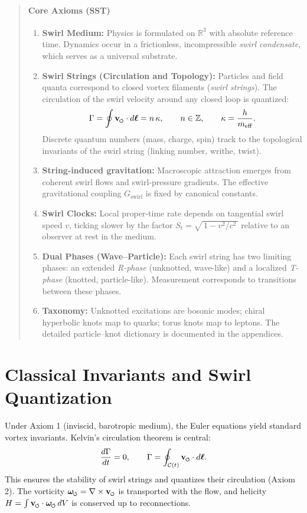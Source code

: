 \documentclass[11pt]{article}
\newcommand{\swirlarrow}{%
    \mathchoice{\mkern-2mu\scriptstyle\boldsymbol{\circlearrowleft}}%
    {\mkern-2mu\scriptstyle\boldsymbol{\circlearrowleft}}%
    {\mkern-2mu\scriptscriptstyle\boldsymbol{\circlearrowleft}}%
    {\mkern-2mu\scriptscriptstyle\boldsymbol{\circlearrowleft}}%
}
\newcommand{\vswirl}{\mathbf{v}_{\swirlarrow}}
\newcommand{\omegas}{\boldsymbol{\omega}_{\swirlarrow}}  %
\begin{document}
\begin{abstract}
\paragraph{Core Axioms (SST)}
    \begin{enumerate}
    \item \textbf{Swirl Medium:} Physics is formulated on $\mathbb{R}^3$ with absolute reference time. Dynamics occur in a frictionless, incompressible \emph{swirl condensate}, which serves as a universal substrate.
    \item \textbf{Swirl Strings (Circulation and Topology):} Particles and field quanta correspond to closed vortex filaments (\emph{swirl strings}). The circulation of the swirl velocity around any closed loop is quantized:
    \[
        \Gamma = \oint \vswirl \cdot d\boldsymbol{\ell} = n\,\kappa,\qquad n\in\mathbb{Z},\qquad \kappa = \frac{h}{m_{\text{eff}}}.
    \]
    Discrete quantum numbers (mass, charge, spin) track to the topological invariants of the swirl string (linking number, writhe, twist).
    \item \textbf{String-induced gravitation:} Macroscopic attraction emerges from coherent swirl flows and swirl-pressure gradients. The effective gravitational coupling $G_{\text{swirl}}$ is fixed by canonical constants.
    \item \textbf{Swirl Clocks:} Local proper-time rate depends on tangential swirl speed $v$, ticking slower by the factor $S_t=\sqrt{\,1-v^2/c^2\,}$ relative to an observer at rest in the medium.
    \item \textbf{Dual Phases (Wave–Particle):} Each swirl string has two limiting phases: an extended \emph{R-phase} (unknotted, wave-like) and a localized \emph{T-phase} (knotted, particle-like). Measurement corresponds to transitions between these phases.
    \item \textbf{Taxonomy:} Unknotted excitations are bosonic modes; chiral hyperbolic knots map to quarks; torus knots map to leptons. The detailed particle–knot dictionary is documented in the appendices.
    \end{enumerate}
\end{abstract}
\vfill
\titlepageClose

\section{Classical Invariants and Swirl Quantization}
    \label{sec:classical_invariants}
    Under Axiom 1 (inviscid, barotropic medium), the Euler equations yield standard vortex invariants. Kelvin's circulation theorem is central:
    \begin{equation}
    \frac{d\Gamma}{dt}=0, \qquad \Gamma=\oint_{\mathcal{C}(t)} \vswirl\cdot d\boldsymbol{\ell}. \label{eq:kelvin}
    \end{equation}
    This ensures the stability of swirl strings and quantizes their circulation (Axiom 2). The vorticity $\omegas = \nabla \times \vswirl$ is transported with the flow, and helicity $H = \int \vswirl \cdot \omegas \, dV$ is conserved up to reconnections.
\end{document}
